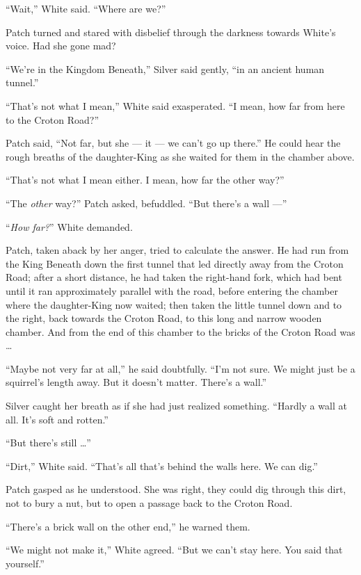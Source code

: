 \documentclass[ebook,oneside,openany,17pt]{memoir}
\newenvironment{tolerant}[1]{%
  \par\tolerance=#1\relax
}{%
  \par
}
\begin{document}
“Wait,” White said. “Where are we?”

Patch turned and stared with disbelief through the darkness towards
White’s voice. Had she gone mad?

“We’re in the Kingdom Beneath,” Silver said gently, “in an ancient
human tunnel.”

“That’s not what I mean,” White said exasperated. “I mean, how far
from here to the Croton Road?”

Patch said, “Not far, but she — it — we can’t go up there.” He could
hear the rough breaths of the daughter-King as she waited for them in
the chamber above.

“That’s not what I mean either. I mean, how far the other way?”

“The \emph{other} way?” Patch asked, befuddled. “But there’s a wall
—”

“\emph{How far?}” White demanded.

\begin{tolerant}{500}
Patch, taken aback by her anger, tried to calculate the answer. He had
run from the King Beneath down the first tunnel that led directly away
from the Croton Road; after a short distance, he had taken the
right-hand fork, which had bent until it ran approximately parallel
with the road, before entering the chamber where the daughter-King now
waited; then taken the little tunnel down and to the right, back
towards the Croton Road, to this long and narrow wooden chamber. And
from the end of this chamber to the bricks of the Croton Road
was\nolinebreak{} …
\end{tolerant}

“Maybe not very far at all,” he said doubtfully. “I’m not sure. We
might just be a squirrel’s length away. But it doesn’t matter. There’s
a wall.”

Silver caught her breath as if she had just realized
something. “Hardly a wall at all. It’s soft and rotten.”

“But there’s still …”

“Dirt,” White said. “That’s all that’s behind the walls here. We can
dig.”

Patch gasped as he understood. She was right, they could dig through
this dirt, not to bury a nut, but to open a passage back to the Croton
Road.

“There’s a brick wall on the other end,” he warned them.

“We might not make it,” White agreed. “But we can’t stay here. You
said that yourself.”
\end{document}
